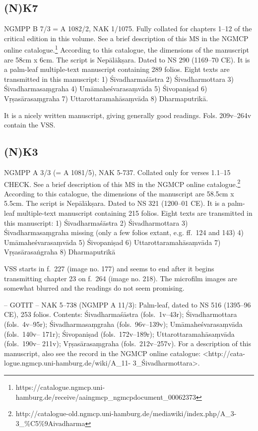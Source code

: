 \documentclass[]{article}
\begin{document}
\hypertarget{nk7}{%
\subsection{(N)K7}\label{nk7}}

NGMPP B 7/3 = A 1082/2, NAK 1/1075. Fully collated for chapters 1--12 of
the critical edition in this volume. See a brief description of this MS
in the NGMCP online catalogue.\footnote{https://catalogue.ngmcp.uni-hamburg.de/receive/aaingmcp\_ngmcpdocument\_00062373}
According to this catalogue, the dimensions of the manuscript are 58cm x
6cm. The script is Nepālākṣara. Dated to NS 290 (1169--70 CE). It is a
palm-leaf multiple-text manuscript containing 289 folios. Eight texts
are transmitted in this manuscript: 1) Śivadharmaśāstra 2)
Śivadharmottara 3) Śivadharmasaṃgraha 4) Umāmaheśvarasaṃvāda 5)
Śivopaniṣad 6) Vṛṣasārasaṃgraha 7) Uttarottaramahāsaṃvāda 8)
Dharmaputrikā.

It is a nicely written manuscript, giving generally good readings. Fols.
209v--264v contain the VSS.

\hypertarget{nk3}{%
\subsection{(N)K3}\label{nk3}}

NGMPP A 3/3 (= A 1081/5), NAK 5-737. Collated only for verses 1.1--15
CHECK. See a brief description of this MS in the NGMCP online
catalogue.\footnote{http://catalogue-old.ngmcp.uni-hamburg.de/mediawiki/index.php/A\_3-3\_\%C5\%9Aivadharma
} According to this catalogue, the dimensions of the manuscript are
58.5cm x 5.5cm. The script is Nepālākṣara. Dated to NS 321 (1200--01
CE). It is a palm-leaf multiple-text manuscript containing 215 folios.
Eight texts are transmitted in this manuscript: 1) Śivadharmaśāstra 2)
Śivadharmottara 3) Śivadharmasaṃgraha missing (only a few folios extant,
e.g. ff.~124 and 143) 4) Umāmaheśvarasaṃvāda 5) Śivopaniṣad 6)
Uttarottaramahāsaṃvāda 7) Vṛṣasārasaṅgraha 8) Dharmaputrikā

VSS starts in f.~227 (image no. 177) and seems to end after it begins
transmitting chapter 23 on f.~264 (image no. 218). The microfilm images
are somewhat blurred and the readings do not seem promising.

-- GOTIT -- NAK 5--738 (NGMPP A 11/3): Palm-leaf, dated to NS 516
(1395--96 CE), 253 folios. Contents: Śivadharmaśāstra (fols.~1v--43r);
Śivadharmottara (fols.~4v--95r); Śivadharmasaṃgraha (fols.~96v--139v);
Umāmaheśvarasaṃvāda (fols.~140v-- 171r); Śivopaniṣad (fols.~172v--189r);
Uttarottaramahāsaṃvāda (fols.~190v-- 211v); Vṛṣasārasaṃgraha
(fols.~212v--257v). For a description of this manuscript, also see the
record in the NGMCP online catalogue: \textless{}http://cata-
logue.ngmcp.uni-hamburg.de/wiki/A\_11- 3\_Śivadharmottara\textgreater{}.
\end{document}
